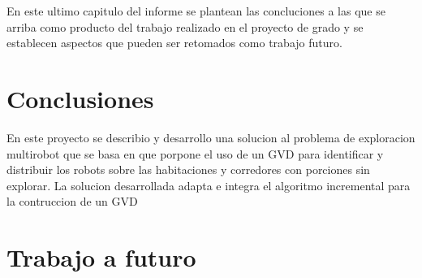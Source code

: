 En este ultimo capitulo del informe se plantean las concluciones a las que se
arriba como producto del trabajo realizado en el proyecto de grado y se
establecen aspectos que pueden ser retomados como trabajo futuro.


\section{Conclusiones}

En este proyecto se describio y desarrollo una solucion al problema de
exploracion multirobot que se basa en \cite{wurm2008coordinated} que porpone el
uso de un GVD para identificar y distribuir los robots sobre las habitaciones y
corredores con porciones sin explorar. La solucion desarrollada adapta e
integra el algoritmo incremental para la contruccion de un GVD



\section{Trabajo a futuro}
